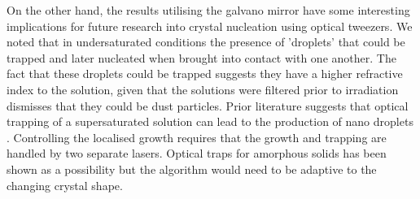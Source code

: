 On the other hand, the results utilising the galvano mirror have some 
interesting implications for future research into crystal nucleation
using optical tweezers. We noted that in undersaturated conditions the
presence of 'droplets' that could be trapped and later nucleated when 
brought into contact with one another. The fact that these droplets 
could be trapped suggests they have a higher refractive index to the 
solution, given that the solutions were filtered prior to irradiation
dismisses that they could be dust particles. Prior literature suggests
that optical trapping of a supersaturated solution can lead to the 
production of nano droplets \cite{Gowayed2021, Tsuboi2009}. Controlling
the localised growth requires that the growth and trapping are handled
by two separate lasers. Optical traps for amorphous solids has been 
shown as a possibility but the algorithm would need to be adaptive 
to the changing crystal shape.


